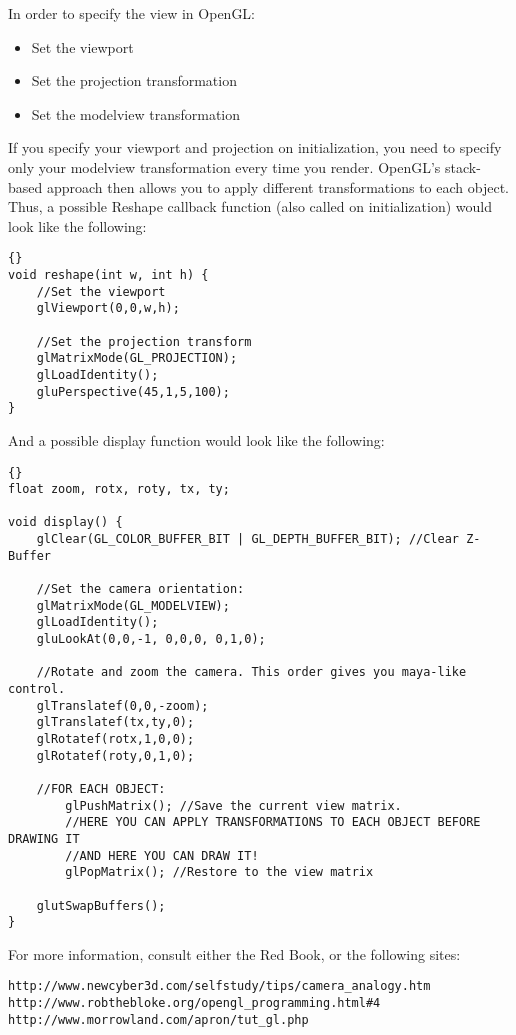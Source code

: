 \documentclass[]{article}
\begin{document}
In order to specify the view in OpenGL:
\begin{itemize}
    \item Set the viewport
    \item Set the projection transformation
    \item Set the modelview transformation
\end{itemize} 

If you specify your viewport and projection on initialization, you need to specify only your modelview transformation every time you render. OpenGL's stack-based approach then allows you to apply different transformations to each object. Thus, a possible Reshape callback function (also called on initialization) would look like the following:
\lstset{language=c++}
\lstset{commentstyle=\textit}
\begin{lstlisting}[frame=TRBL, caption=Specifying the view]{}
void reshape(int w, int h) {
    //Set the viewport
    glViewport(0,0,w,h);
    
    //Set the projection transform
    glMatrixMode(GL_PROJECTION);
    glLoadIdentity();
    gluPerspective(45,1,5,100);
}
\end{lstlisting}

And a possible display function would look like the following:

\lstset{language=c++}
\lstset{commentstyle=\textit}
\begin{lstlisting}[frame=TRBL, caption=Rendering the scene]{}
float zoom, rotx, roty, tx, ty;

void display() {
    glClear(GL_COLOR_BUFFER_BIT | GL_DEPTH_BUFFER_BIT); //Clear Z-Buffer
    
    //Set the camera orientation:
    glMatrixMode(GL_MODELVIEW);
    glLoadIdentity();
    gluLookAt(0,0,-1, 0,0,0, 0,1,0);    
    
    //Rotate and zoom the camera. This order gives you maya-like control.
    glTranslatef(0,0,-zoom);
    glTranslatef(tx,ty,0);
    glRotatef(rotx,1,0,0);
    glRotatef(roty,0,1,0);
    
    //FOR EACH OBJECT:
        glPushMatrix(); //Save the current view matrix.
        //HERE YOU CAN APPLY TRANSFORMATIONS TO EACH OBJECT BEFORE DRAWING IT
        //AND HERE YOU CAN DRAW IT!
        glPopMatrix(); //Restore to the view matrix
            
    glutSwapBuffers();
}
\end{lstlisting}

For more information, consult either the Red Book, or the following sites:
\begin{verbatim}
http://www.newcyber3d.com/selfstudy/tips/camera_analogy.htm
http://www.robthebloke.org/opengl_programming.html#4
http://www.morrowland.com/apron/tut_gl.php
\end{verbatim}
\end{document}
